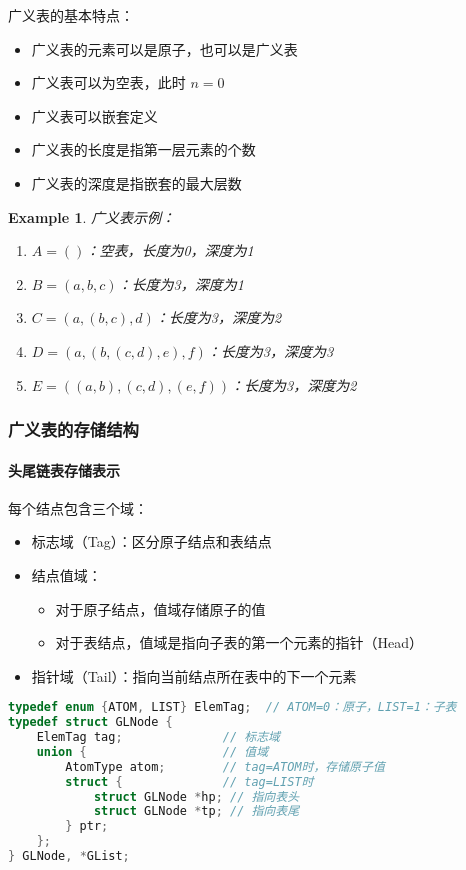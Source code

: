 \documentclass{../../note}
\newtheorem{example}{Example}
\begin{document}
广义表的基本特点：
\begin{itemize}
  \item 广义表的元素可以是原子，也可以是广义表
  \item 广义表可以为空表，此时 $n=0$
  \item 广义表可以嵌套定义
  \item 广义表的长度是指第一层元素的个数
  \item 广义表的深度是指嵌套的最大层数
\end{itemize}

\begin{example}
  广义表示例：
  \begin{enumerate}
    \item $A = ()$：空表，长度为0，深度为1
    \item $B = (a, b, c)$：长度为3，深度为1
    \item $C = (a, (b, c), d)$：长度为3，深度为2
    \item $D = (a, (b, (c, d), e), f)$：长度为3，深度为3
    \item $E = ((a, b), (c, d), (e, f))$：长度为3，深度为2
  \end{enumerate}
\end{example}

\subsubsection{广义表的存储结构}

\paragraph{头尾链表存储表示}

每个结点包含三个域：
\begin{itemize}
  \item 标志域（Tag）：区分原子结点和表结点
  \item 结点值域：
    \begin{itemize}
      \item 对于原子结点，值域存储原子的值
      \item 对于表结点，值域是指向子表的第一个元素的指针（Head）
    \end{itemize}
  \item 指针域（Tail）：指向当前结点所在表中的下一个元素
\end{itemize}

\begin{lstlisting}[language=C]
typedef enum {ATOM, LIST} ElemTag;  // ATOM=0：原子，LIST=1：子表
typedef struct GLNode {
    ElemTag tag;              // 标志域
    union {                   // 值域
        AtomType atom;        // tag=ATOM时，存储原子值
        struct {              // tag=LIST时
            struct GLNode *hp; // 指向表头
            struct GLNode *tp; // 指向表尾
        } ptr;
    };
} GLNode, *GList;
\end{lstlisting}
\end{document}
